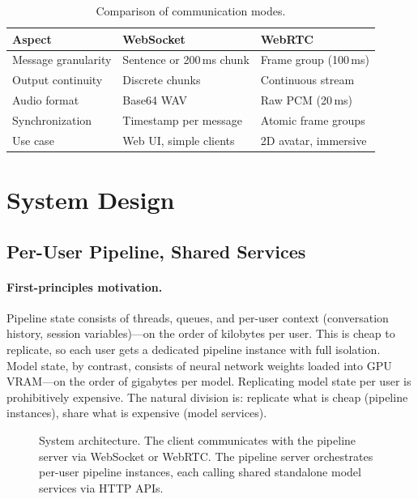 \documentclass[11pt,a4paper]{article}
\begin{document}
\begin{table}[h]
    \centering
    \caption{Comparison of communication modes.}
    \label{tab:ws_vs_webrtc}
    \begin{tabular}{lll}
        \toprule
        \textbf{Aspect} & \textbf{WebSocket} & \textbf{WebRTC} \\
        \midrule
        Message granularity & Sentence or 200\,ms chunk & Frame group (100\,ms) \\
        Output continuity & Discrete chunks & Continuous stream \\
        Audio format & Base64 WAV & Raw PCM (20\,ms) \\
        Synchronization & Timestamp per message & Atomic frame groups \\
        Use case & Web UI, simple clients & 2D avatar, immersive \\
        \bottomrule
    \end{tabular}
\end{table}

\section{System Design}
\label{sec:system}

\subsection{Per-User Pipeline, Shared Services}

\paragraph{First-principles motivation.}
Pipeline state consists of threads, queues, and per-user context (conversation history, session variables)---on the order of kilobytes per user. This is cheap to replicate, so each user gets a dedicated pipeline instance with full isolation. Model state, by contrast, consists of neural network weights loaded into GPU VRAM---on the order of gigabytes per model. Replicating model state per user is prohibitively expensive. The natural division is: replicate what is cheap (pipeline instances), share what is expensive (model services).

\begin{figure}[h]
    \centering
    \caption{System architecture. The client communicates with the pipeline server via WebSocket or WebRTC. The pipeline server orchestrates per-user pipeline instances, each calling shared standalone model services via HTTP APIs.}
    \label{fig:architecture}
\end{figure}
\end{document}
